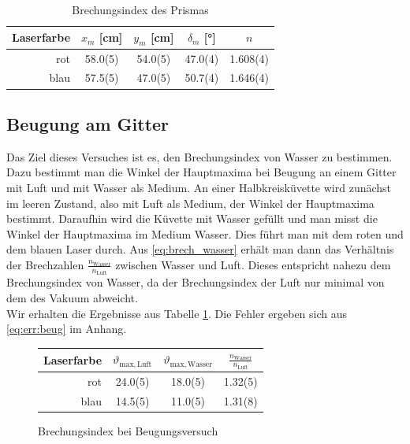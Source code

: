 \begin{table}[h]
\centering
{}
\begin{tabular}{r|SSSS[table-figures-decimal = 3, table-figures-integer = 1]}
Laserfarbe & {$ x_m $ [\si{cm}]} & {$ y_m $ [\si{cm}]} 
& {$ \delta_m $ [\si{\degree}]} & {$ n $} \\\hline
rot & 58.0(5) & 54.0(5) & 47.0(4) & 1.608(4) \\
blau & 57.5(5) & 47.0(5) & 50.7(4) & 1.646(4)
\end{tabular}
\caption{Brechungsindex des Prismas}
\label{tab:prisma}
\end{table}


\subsection{Beugung am Gitter}
Das Ziel dieses Versuches ist es, den Brechungsindex von Wasser zu bestimmen. Dazu bestimmt man die Winkel der Hauptmaxima bei Beugung an einem Gitter mit Luft und mit Wasser als Medium. An einer Halbkreisküvette wird zunächst im leeren Zustand, also mit Luft als Medium, der Winkel der Hauptmaxima bestimmt. Daraufhin wird die Küvette mit Wasser gefüllt und man misst die Winkel der Hauptmaxima im Medium Wasser. Dies führt man mit dem roten und dem blauen Laser durch. Aus \eqref{eq:brech_wasser} erhält man dann das Verhältnis der Brechzahlen $ \frac{n_\mathrm{Wasser}}{n_\mathrm{Luft}} $ zwischen Wasser und Luft. Dieses entspricht nahezu dem Brechungsindex von Wasser, da der Brechungsindex der Luft nur minimal von dem des Vakuum abweicht. \\
Wir erhalten die Ergebnisse aus Tabelle \ref{tab:beug}. Die Fehler ergeben sich aus \eqref{eq:err:beug} im Anhang.
\begin{figure}[h]
	\centering
	\begin{tabular}{r|SSS[table-figures-integer = 1, table-figures-decimal=2]}
	Laserfarbe & {$ \vartheta_\mathrm{max, Luft} $} & {$ \vartheta_\mathrm{max, Wasser} $} & $ \frac{n_\mathrm{Wasser}}{n_\mathrm{Luft}} $ \\\hline
	rot & 24.0(5) & 18.0(5) & 1.32(5) \\
	blau & 14.5(5) & 11.0(5) & 1.31(8)
	\end{tabular}
	\caption{Brechungsindex bei Beugungsversuch}
	\label{tab:beug}
\end{figure}

